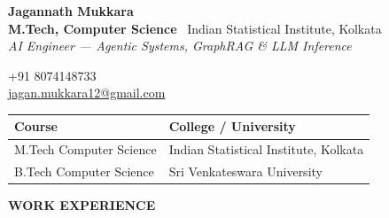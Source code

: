 \documentclass[10pt,article]{article}
\newcommand{\resheading}[1]{%
 \vspace{7pt}%
 \noindent\colorbox{mygrey}{\parbox{\dimexpr\textwidth-2\fboxsep\relax}{\textbf{\small #1}}}%
 \vspace{4pt}%
}
\begin{document}
\noindent
\begin{minipage}[b]{0.68\textwidth}
   {\Large \textbf{Jagannath Mukkara}}\\[2pt]
   \textbf{M.Tech, Computer Science} \textbar\ Indian Statistical Institute, Kolkata \\[1pt]
   \small \textit{AI Engineer --- Agentic Systems, GraphRAG \& LLM Inference}
\end{minipage}%
\hfill
\begin{minipage}[b]{0.32\textwidth}
   \raggedleft \small
   +91 8074148733 \\
   \href{mailto:jagan.mukkara12@gmail.com}{jagan.mukkara12@gmail.com}
\end{minipage}
\vspace{6pt}
\noindent
\begin{tabularx}{\textwidth}{@{} l X @{}}
\toprule
\textbf{Course} & \textbf{College / University} \\
\midrule
M.Tech Computer Science & Indian Statistical Institute, Kolkata \\
B.Tech Computer Science & Sri Venkateswara University \\
\bottomrule
\end{tabularx}
\resheading{WORK EXPERIENCE}
\end{document}
